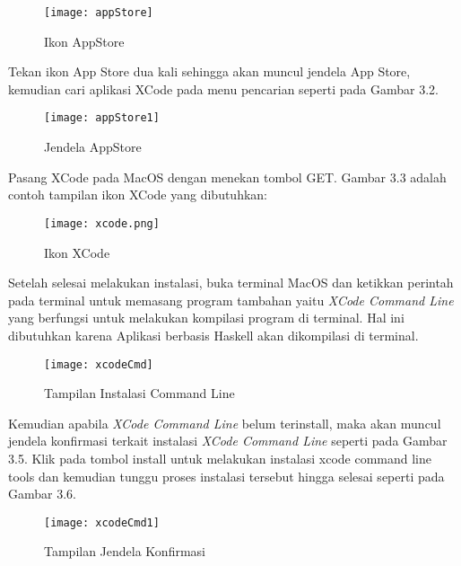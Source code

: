 \documentclass[pi.tex]{subfile}
\begin{document}
  \begin{figure}[H]
      \centering
  \texttt{[image: appStore]}
  \caption[Ikon AppStore]{Ikon AppStore}

  \end{figure}

  \hspace{10pt}Tekan ikon App Store dua kali sehingga akan muncul jendela App Store, kemudian cari aplikasi XCode pada menu pencarian seperti pada Gambar 3.2.

  \begin{figure}[H]
      \centering
  \texttt{[image: appStore1]}
  \caption[Jendela AppStore]{Jendela AppStore}

  \end{figure}

  \hspace{10pt}Pasang XCode pada MacOS dengan menekan tombol GET. Gambar 3.3 adalah contoh tampilan ikon XCode yang dibutuhkan:
  

  \begin{figure}[H]
      \centering
  \texttt{[image: xcode.png]}
  \caption[Ikon XCode]{Ikon XCode}
  \end{figure}

  \hspace{10pt}Setelah selesai melakukan instalasi, buka terminal MacOS dan ketikkan perintah  pada terminal untuk memasang program tambahan yaitu \emph{XCode Command Line} yang berfungsi untuk melakukan kompilasi program di terminal. Hal ini dibutuhkan karena Aplikasi berbasis Haskell akan dikompilasi di terminal.

  \begin{figure}[H]
      \centering
  \texttt{[image: xcodeCmd]}
  \caption[Tampilan Instalasi Command Line]{Tampilan Instalasi Command Line}
  \end{figure}

  \hspace{10pt}Kemudian apabila \emph{XCode Command Line} belum terinstall, maka akan muncul jendela konfirmasi terkait instalasi \emph{XCode Command Line} seperti pada Gambar 3.5. Klik pada tombol install untuk melakukan instalasi xcode command line tools dan kemudian tunggu proses instalasi tersebut hingga selesai seperti pada Gambar 3.6.

 \begin{figure}[H]
      \centering
  \texttt{[image: xcodeCmd1]}
  \caption[Tampilan Jendela Konfirmasi]{Tampilan Jendela Konfirmasi}
 \end{figure}
\end{document}

